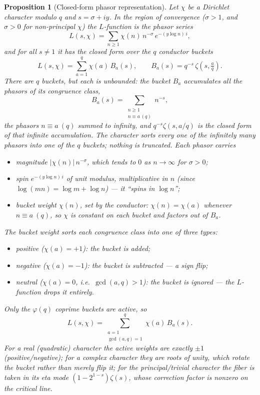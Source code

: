 \documentclass[11pt]{article}
\newtheorem{proposition}[definition]{Proposition}
\begin{document}
\begin{proposition}[Closed-form phasor representation]
Let $\chi$ be a Dirichlet character modulo $q$ and $s=\sigma+iy$.  In the region
of convergence ($\sigma>1$, and $\sigma>0$ for non-principal $\chi$) the
$L$-function is the phasor series
\[
  L(s,\chi)=\sum_{n\ge1}\chi(n)\,n^{-\sigma}\,e^{-(y\log n)\,i},
\]
and for all $s\ne1$ it has the closed form over the $q$ conductor buckets
\[
  L(s,\chi)=\sum_{a=1}^{q}\chi(a)\,B_a(s),
  \qquad
  B_a(s)=q^{-s}\,\zeta\!\left(s,\tfrac aq\right).
\]
There are $q$ buckets, but each is unbounded: the bucket $B_a$ accumulates
\emph{all} the phasors of its congruence class,
\[
  B_a(s)=\!\!\sum_{\substack{n\ge1\\ n\equiv a\,(q)}}\!\! n^{-s},
\]
the phasors $n\equiv a\ (q)$ summed to infinity, and $q^{-s}\zeta(s,a/q)$ is the
closed form of that infinite accumulation.  The character sorts every one of the
infinitely many phasors into one of the $q$ buckets; nothing is truncated.
Each phasor carries
\begin{itemize}
\item \emph{magnitude} $|\chi(n)|\,n^{-\sigma}$, which tends to $0$ as
  $n\to\infty$ for $\sigma>0$;
\item \emph{spin} $e^{-(y\log n)\,i}$ of unit modulus, multiplicative in $n$
  (since $\log(mn)=\log m+\log n$) --- it ``spins in $\log n$'';
\item \emph{bucket weight} $\chi(n)$, set by the conductor: $\chi(n)=\chi(a)$
  whenever $n\equiv a\ (q)$, so $\chi$ is constant on each bucket and factors out
  of $B_a$.
\end{itemize}
The bucket weight sorts each congruence class into one of three types:
\begin{itemize}
\item \emph{positive} ($\chi(a)=+1$): the bucket is added;
\item \emph{negative} ($\chi(a)=-1$): the bucket is subtracted --- a sign flip;
\item \emph{neutral} ($\chi(a)=0$, i.e.\ $\gcd(a,q)>1$): the bucket is
  \emph{ignored} --- the $L$-function drops it entirely.
\end{itemize}
Only the $\varphi(q)$ coprime buckets are active, so
\[
  L(s,\chi)=\!\!\sum_{\substack{a=1\\ \gcd(a,q)=1}}^{q}\!\!\chi(a)\,B_a(s).
\]
For a real (quadratic) character the active weights are exactly $\pm1$
(positive/negative); for a complex character they are roots of unity, which
\emph{rotate} the bucket rather than merely flip it; for the principal/trivial
character the fiber is taken in its eta mode $(1-2^{1-s})\zeta(s)$, whose
correction factor is nonzero on the critical line.
\end{proposition}
\end{document}
